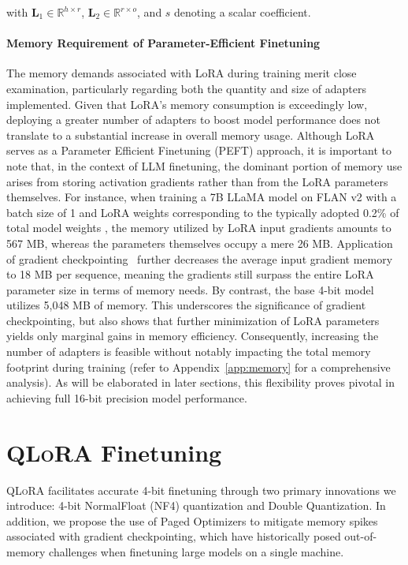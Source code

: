 with $\mathbf{L}_1\in  \mathbb{R}^{h\times r}$, $\mathbf{L}_2\in  \mathbb{R}^{r\times o}$, and $s$ denoting a scalar coefficient.

\paragraph{Memory Requirement of Parameter-Efficient Finetuning} The memory demands associated with LoRA during training merit close examination, particularly regarding both the quantity and size of adapters implemented. Given that LoRA’s memory consumption is exceedingly low, deploying a greater number of adapters to boost model performance does not translate to a substantial increase in overall memory usage. Although LoRA serves as a Parameter Efficient Finetuning (PEFT) approach, it is important to note that, in the context of LLM finetuning, the dominant portion of memory use arises from storing activation gradients rather than from the LoRA parameters themselves. For instance, when training a 7B LLaMA model on FLAN v2 with a batch size of 1 and LoRA weights corresponding to the typically adopted 0.2\% of total model weights \citep{hu2021lora,liu2022few}, the memory utilized by LoRA input gradients amounts to 567 MB, whereas the parameters themselves occupy a mere 26 MB. Application of gradient checkpointing~\citep{chen2016training} further decreases the average input gradient memory to 18 MB per sequence, meaning the gradients still surpass the entire LoRA parameter size in terms of memory needs. By contrast, the base 4-bit model utilizes 5,048 MB of memory. This underscores the significance of gradient checkpointing, but also shows that further minimization of LoRA parameters yields only marginal gains in memory efficiency. Consequently, increasing the number of adapters is feasible without notably impacting the total memory footprint during training (refer to Appendix~\ref{app:memory} for a comprehensive analysis). As will be elaborated in later sections, this flexibility proves pivotal in achieving full 16-bit precision model performance.

\section{\textsc{QLoRA} Finetuning}

\textsc{QLoRA} facilitates accurate 4-bit finetuning through two primary innovations we introduce: 4-bit NormalFloat (NF4) quantization and Double Quantization. In addition, we propose the use of Paged Optimizers to mitigate memory spikes associated with gradient checkpointing, which have historically posed out-of-memory challenges when finetuning large models on a single machine.

